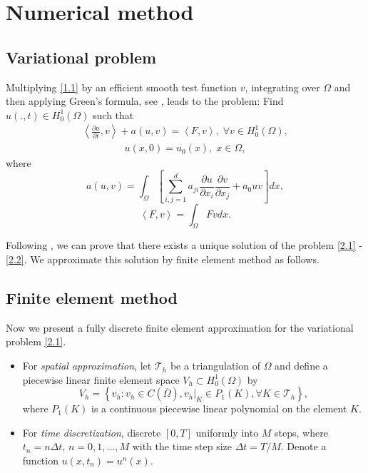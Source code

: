 \documentclass[twocolumn]{article}
\begin{document}
\section{Numerical method} 
\subsection{Variational problem}
\quad Multiplying \eqref{1.1} by an efficient smooth test function $v$, integrating over $\Omega$ and then applying Green's formula, see \cite{F05}, leads to the problem: Find $u(.,t)\in H^1_0(\Omega)$ such that
\begin{align}\label{2.1}
	\left\langle \frac{\partial u}{\partial t}, v \right\rangle+a\left(u, v\right)=\left\langle F, v \right\rangle,\; \forall v\in H^1_0(\Omega),
\end{align} 
\begin{align}\label{2.2}
	u(x, 0)=u_0(x), \; x\in \Omega,
\end{align}
where 
$$a\left(u, v\right)=\int_{\Omega}\left[\sum_{i, j=1}^{d}a_{ji}\frac{\partial u}{\partial x_i}\frac{\partial v}{\partial x_j}+a_0uv\right]dx,$$
$$\left\langle F, v \right\rangle=\int_{\Omega}F vdx.$$

Following \cite{L98, W87, C87, SV03}, we can prove that there exists a unique solution of the problem \eqref{2.1} - \eqref{2.2}. We approximate this solution by finite element method as follows. 
\subsection{Finite element method}
\quad Now we present a fully discrete finite element approximation for the variational problem \eqref{2.1}.
\begin{itemize}
	\item For \textit{spatial approximation}, let $\mathcal{T}_h$ be a triangulation of $\Omega$ and define a piecewise linear finite element space $V_h \subset H^1_0(\Omega)$ by
	$$V_h=\left\{v_h:v_h\in C(\overline{\Omega}), v_h|_K\in P_1(K), \forall K\in \mathcal{T}_h\right\},$$
	where $P_1(K)$ is a continuous piecewise linear polynomial on the element $K$.
	\item For \textit{time discretization}, discrete $[0, T]$ uniformly into $M$ steps, where $t_n=n\Delta t,\, n=0, 1, \dots, M$ with the time step size $\Delta t = T/M$. Denote a function $u(x, t_n)=u^n(x)$.
\end{itemize}
\end{document}
